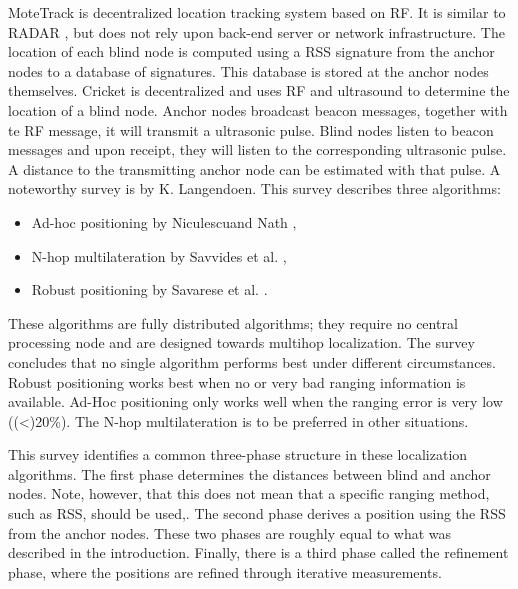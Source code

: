 MoteTrack\cite{lorincz2007mrd} is decentralized location tracking system based on RF. It is similar to RADAR \cite{bahl2000rbr}, but does not rely upon back-end server or network infrastructure. The location of each blind node is computed using a RSS signature from the anchor nodes to a database of signatures. This database is stored at the anchor nodes themselves.
Cricket \cite{priyantha2000cls} is decentralized and uses RF and ultrasound to determine the location of a blind node. Anchor nodes broadcast beacon messages, together with te RF message, it will transmit a ultrasonic pulse. Blind nodes listen to beacon messages and upon receipt, they will listen to the corresponding ultrasonic pulse. A distance to the transmitting anchor node can be estimated with that pulse.
A noteworthy survey is \cite{langendoen2003dlw} by K. Langendoen. This survey describes three algorithms: 
\begin{itemize}
	\item Ad-hoc positioning by Niculescuand Nath \cite{niculescu2003dbp}, 
	\item N-hop multilateration by Savvides et al. \cite{savvides2003nhm}, 
	\item Robust positioning by Savarese et al. \cite{savarese2002rpa}. 
\end{itemize}
These algorithms are fully distributed algorithms; they require no central processing node and are designed towards multihop localization. The survey concludes that no single algorithm performs best under different circumstances. Robust positioning works best when no or very bad ranging information is available. Ad-Hoc positioning only works well when the ranging error is very low ((<)20\%). The N-hop multilateration is to be preferred in other situations. 

This survey identifies a common three-phase structure in these localization algorithms. The first phase determines the distances between blind and anchor nodes. Note, however, that this does not mean that a specific ranging method, such as RSS, should be used,. The second phase derives a position using the RSS from the anchor nodes. These two phases are roughly equal to what was described in the introduction. Finally, there is a third phase called the refinement phase, where the positions are refined through iterative measurements. 

